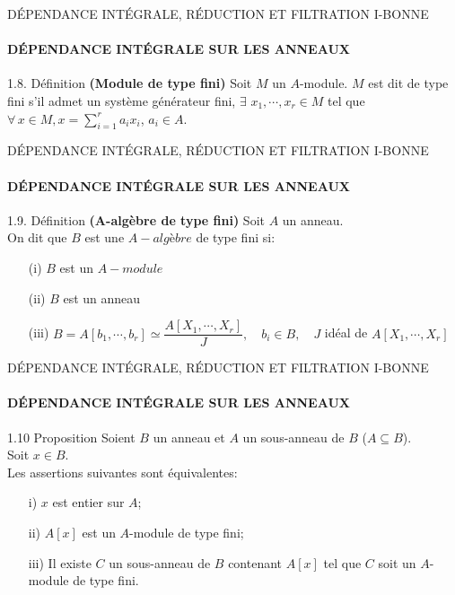 \documentclass[11pt,a4paper]{beamer}
\begin{document}
\begin{frame}{DÉPENDANCE INTÉGRALE, RÉDUCTION ET FILTRATION I-BONNE}
	\framesubtitle{DÉPENDANCE INTÉGRALE SUR LES ANNEAUX}
	\begin{block}{1.8. Définition \textbf{(Module de type fini)}}
	Soit $M$ un $A$-module. $M$ est dit de type fini s'il admet un système générateur fini, $\exists \, \, x_1, \cdots ,x_r \in M$ tel que $\forall \,  x \in M, x = \displaystyle \sum_{i=1}^{r}{a_i x_i}$, $a_i \in A$.	
	\end{block}
\end{frame}

\begin{frame}{DÉPENDANCE INTÉGRALE, RÉDUCTION ET FILTRATION I-BONNE}
	\framesubtitle{DÉPENDANCE INTÉGRALE SUR LES ANNEAUX}
	\begin{block}{1.9. Définition \textbf{(A-algèbre de type fini)}}
		Soit $A$ un anneau. \\
		On dit que $B$ est une $A-algèbre$ de type fini si:
		\begin{enumerate}
			\item[(i)] $B$ est un $A-module$ \pause
			\item[(ii)] $B$ est un anneau \pause
			\item[(iii)] $B = A [b_1, \cdots, b_r] \simeq \dfrac{A[X_1, \cdots, X_r]}{J}, \quad b_i \in B , \quad J$ idéal de $A[X_1, \cdots, X_r]$
		\end{enumerate}	
	\end{block}
\end{frame}

\begin{frame}{DÉPENDANCE INTÉGRALE, RÉDUCTION ET FILTRATION I-BONNE}
	\framesubtitle{DÉPENDANCE INTÉGRALE SUR LES ANNEAUX}
	\begin{block}{1.10 Proposition}
		Soient $B$ un anneau et $A$ un sous-anneau de $B$ ($A \subseteq B$).\\
		Soit $x \in B$. \\
		Les assertions suivantes sont équivalentes:
		\begin{enumerate}
			\item[i)]$x$ est entier sur $A$; \pause
			\item[ii)]$A\left[ x\right]$ est un $A$-module de type fini; \pause
			\item[iii)]Il existe $C$ un sous-anneau de $B$ contenant $A\left[ x\right]$ tel que $C$ soit un $A$-module de type fini.
		\end{enumerate}
	\end{block}
\end{frame}
\end{document}
